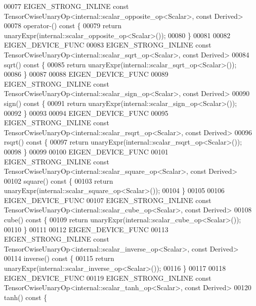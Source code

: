 \begin{DoxyCode}
00077     EIGEN\_STRONG\_INLINE \textcolor{keyword}{const} TensorCwiseUnaryOp<internal::scalar\_opposite\_op<Scalar>, \textcolor{keyword}{const} Derived>
00078     operator-()\textcolor{keyword}{ const }\{
00079       \textcolor{keywordflow}{return} unaryExpr(internal::scalar\_opposite\_op<Scalar>());
00080     \}
00081 
00082     EIGEN\_DEVICE\_FUNC
00083     EIGEN\_STRONG\_INLINE \textcolor{keyword}{const} TensorCwiseUnaryOp<internal::scalar\_sqrt\_op<Scalar>, \textcolor{keyword}{const} Derived>
00084     sqrt()\textcolor{keyword}{ const }\{
00085       \textcolor{keywordflow}{return} unaryExpr(internal::scalar\_sqrt\_op<Scalar>());
00086     \}
00087 
00088     EIGEN\_DEVICE\_FUNC
00089     EIGEN\_STRONG\_INLINE \textcolor{keyword}{const} TensorCwiseUnaryOp<internal::scalar\_sign\_op<Scalar>, \textcolor{keyword}{const} Derived>
00090     sign()\textcolor{keyword}{ const }\{
00091       \textcolor{keywordflow}{return} unaryExpr(internal::scalar\_sign\_op<Scalar>());
00092     \}
00093 
00094     EIGEN\_DEVICE\_FUNC
00095     EIGEN\_STRONG\_INLINE \textcolor{keyword}{const} TensorCwiseUnaryOp<internal::scalar\_rsqrt\_op<Scalar>, \textcolor{keyword}{const} Derived>
00096     rsqrt()\textcolor{keyword}{ const }\{
00097       \textcolor{keywordflow}{return} unaryExpr(internal::scalar\_rsqrt\_op<Scalar>());
00098     \}
00099 
00100     EIGEN\_DEVICE\_FUNC
00101     EIGEN\_STRONG\_INLINE \textcolor{keyword}{const} TensorCwiseUnaryOp<internal::scalar\_square\_op<Scalar>, \textcolor{keyword}{const} Derived>
00102     square()\textcolor{keyword}{ const }\{
00103       \textcolor{keywordflow}{return} unaryExpr(internal::scalar\_square\_op<Scalar>());
00104     \}
00105 
00106     EIGEN\_DEVICE\_FUNC
00107     EIGEN\_STRONG\_INLINE \textcolor{keyword}{const} TensorCwiseUnaryOp<internal::scalar\_cube\_op<Scalar>, \textcolor{keyword}{const} Derived>
00108     cube()\textcolor{keyword}{ const }\{
00109       \textcolor{keywordflow}{return} unaryExpr(internal::scalar\_cube\_op<Scalar>());
00110     \}
00111 
00112     EIGEN\_DEVICE\_FUNC
00113     EIGEN\_STRONG\_INLINE \textcolor{keyword}{const} TensorCwiseUnaryOp<internal::scalar\_inverse\_op<Scalar>, \textcolor{keyword}{const} Derived>
00114     inverse()\textcolor{keyword}{ const }\{
00115       \textcolor{keywordflow}{return} unaryExpr(internal::scalar\_inverse\_op<Scalar>());
00116     \}
00117 
00118     EIGEN\_DEVICE\_FUNC
00119     EIGEN\_STRONG\_INLINE \textcolor{keyword}{const} TensorCwiseUnaryOp<internal::scalar\_tanh\_op<Scalar>, \textcolor{keyword}{const} Derived>
00120     tanh()\textcolor{keyword}{ const }\{

\end{DoxyCode}
